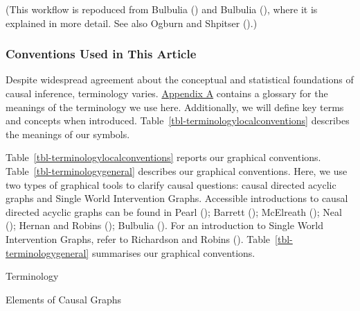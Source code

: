 \documentclass[
  single column]{article}
\begin{document}
(This workflow is repoduced from Bulbulia
() and Bulbulia
(), where it is explained in more
detail. See also Ogburn and Shpitser ().)

\subsubsection{Conventions Used in This
Article}\label{conventions-used-in-this-article}

Despite widespread agreement about the conceptual and statistical
foundations of causal inference, terminology varies.
\hyperref[id-app-a]{Appendix A} contains a glossary for the meanings of
the terminology we use here. Additionally, we will define key terms and
concepts when introduced. Table~\ref{tbl-terminologylocalconventions}
describes the meanings of our symbols.

Table~\ref{tbl-terminologylocalconventions} reports our graphical
conventions. Table~\ref{tbl-terminologygeneral} describes our graphical
conventions. Here, we use two types of graphical tools to clarify causal
questions: causal directed acyclic graphs and Single World Intervention
Graphs. Accessible introductions to causal directed acyclic graphs can
be found in Pearl (); Barrett
(); McElreath
(); Neal
(); Hernan and Robins
(); Bulbulia
(). For an introduction to Single World
Intervention Graphs, refer to Richardson and Robins
().
Table~\ref{tbl-terminologygeneral} summarises our graphical conventions.

\begin{table}

\caption{\label{tbl-terminologylocalconventions}Terminology}

\centering{

\terminologylocalconventions

}

\end{table}%

\begin{table}

\caption{\label{tbl-terminologygeneral}Elements of Causal Graphs}

\centering{

\terminologygeneral

}

\end{table}%
\end{document}

